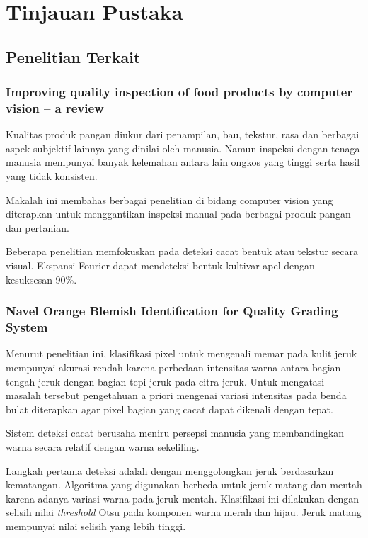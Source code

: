 \documentclass[laporan.tex]{subfiles}
\begin{document}
\chapter{Tinjauan Pustaka}

\section{Penelitian Terkait}

\subsection{Improving quality inspection of food products by computer vision – a review}

Kualitas produk pangan diukur dari penampilan, bau, tekstur, rasa dan berbagai aspek subjektif lainnya yang dinilai oleh manusia. Namun inspeksi dengan tenaga manusia mempunyai banyak kelemahan antara lain ongkos yang tinggi serta  hasil yang tidak konsisten.

Makalah ini\cite{brosnan} membahas berbagai penelitian di bidang computer vision yang diterapkan untuk menggantikan inspeksi manual pada berbagai produk pangan dan pertanian.

Beberapa penelitian memfokuskan pada deteksi cacat bentuk atau tekstur secara visual. Ekspansi Fourier dapat mendeteksi bentuk kultivar apel dengan kesuksesan 90\%.

\subsection{Navel Orange Blemish Identification for Quality Grading System}

Menurut penelitian ini, klasifikasi pixel untuk mengenali memar pada kulit jeruk mempunyai akurasi rendah karena perbedaan intensitas warna antara bagian tengah jeruk dengan bagian tepi jeruk pada citra jeruk. Untuk mengatasi masalah tersebut pengetahuan a priori mengenai variasi intensitas pada benda bulat diterapkan agar pixel bagian yang cacat dapat dikenali dengan tepat.

Sistem deteksi cacat berusaha meniru persepsi manusia yang membandingkan warna secara relatif dengan warna sekeliling.

Langkah pertama deteksi adalah dengan menggolongkan jeruk berdasarkan kematangan. Algoritma yang digunakan berbeda untuk jeruk matang dan mentah karena adanya variasi warna pada jeruk mentah. Klasifikasi ini dilakukan dengan selisih nilai \emph{threshold} Otsu pada komponen warna merah dan hijau. Jeruk matang mempunyai nilai selisih yang lebih tinggi.
\end{document}

